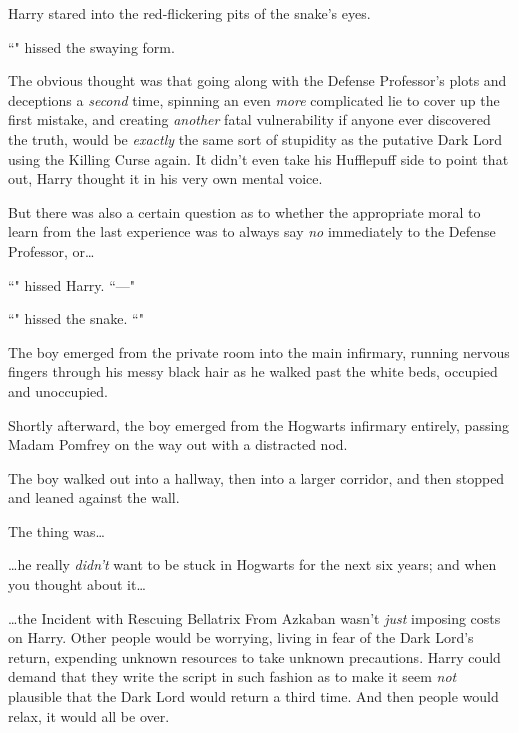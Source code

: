 Harry stared into the red-flickering pits of the snake's eyes.

``" hissed the swaying form.

The obvious thought was that going along with the Defense Professor's plots and deceptions a \emph{second} time, spinning an even \emph{more} complicated lie to cover up the first mistake, and creating \emph{another} fatal vulnerability if anyone ever discovered the truth, would be \emph{exactly} the same sort of stupidity as the putative Dark Lord using the Killing Curse again. It didn't even take his Hufflepuff side to point that out, Harry thought it in his very own mental voice.

But there was also a certain question as to whether the appropriate moral to learn from the last experience was to always say \emph{no} immediately to the Defense Professor, or{\ldots}

``" hissed Harry. ``—"

``" hissed the snake. ``"

\later

The boy emerged from the private room into the main infirmary, running nervous fingers through his messy black hair as he walked past the white beds, occupied and unoccupied.

Shortly afterward, the boy emerged from the Hogwarts infirmary entirely, passing Madam Pomfrey on the way out with a distracted nod.

The boy walked out into a hallway, then into a larger corridor, and then stopped and leaned against the wall.

The thing was{\ldots}

{\ldots}he really \emph{didn't} want to be stuck in Hogwarts for the next six years; and when you thought about it{\ldots}

{\ldots}the Incident with Rescuing Bellatrix From Azkaban wasn't \emph{just} imposing costs on Harry. Other people would be worrying, living in fear of the Dark Lord's return, expending unknown resources to take unknown precautions. Harry could demand that they write the script in such fashion as to make it seem \emph{not} plausible that the Dark Lord would return a third time. And then people would relax, it would all be over.

